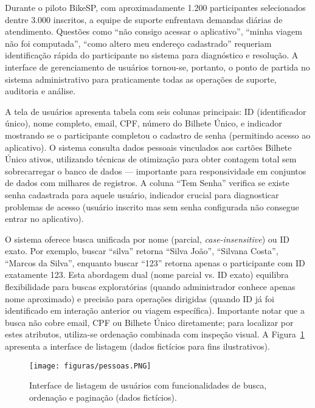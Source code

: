 

Durante o piloto BikeSP, com
aproximadamente 1.200 participantes selecionados dentre 3.000 inscritos, a equipe de
suporte enfrentava demandas diárias de atendimento. Questões como ``não consigo acessar o aplicativo'', ``minha viagem não foi
computada'', ``como altero meu endereço cadastrado'' requeriam identificação rápida
do participante no sistema para diagnóstico e resolução. A interface de gerenciamento
de usuários tornou-se, portanto, o
ponto de partida no sistema administrativo  para praticamente todas as operações de suporte,
auditoria e análise.

A tela de usuários apresenta
tabela com seis colunas principais: ID (identificador único), nome
completo, email, CPF, número do Bilhete Único, e indicador mostrando se o participante
completou o cadastro de senha (permitindo acesso ao aplicativo). O sistema consulta dados pessoais vinculados aos cartões Bilhete Único ativos, utilizando técnicas de otimização para obter contagem total sem sobrecarregar o banco de dados --- importante para responsividade em conjuntos de dados com milhares de registros. A coluna ``Tem Senha'' verifica se existe senha cadastrada para aquele usuário, indicador crucial para diagnosticar
problemas de acesso (usuário inscrito mas sem senha configurada não consegue entrar no aplicativo).

O sistema oferece busca unificada por nome
(parcial, \textit{case-insensitive}\@) ou ID exato.
Por exemplo, buscar ``silva'' retorna ``Silva João'', ``Silvana Costa'', ``Marcos da
Silva'', enquanto buscar ``123'' retorna apenas o participante com ID exatamente 123.
Esta abordagem dual (nome parcial vs. ID exato) equilibra flexibilidade para buscas
exploratórias (quando administrador conhece apenas nome aproximado) e precisão para
operações dirigidas (quando ID já foi identificado em interação anterior ou viagem
específica). Importante notar que a busca não cobre email, CPF ou Bilhete
Único diretamente; para localizar por estes atributos, utiliza-se ordenação combinada com inspeção visual. A Figura~\ref{fig:usuarios_listagem} apresenta a interface de listagem (dados fictícios para fins ilustrativos).


\begin{figure}[htb]
    \centering
    \texttt{[image: figuras/pessoas.PNG]}
    \caption{Interface de listagem de usuários com funcionalidades de busca, ordenação e paginação (dados fictícios).}
    \label{fig:usuarios_listagem}
  \end{figure}

